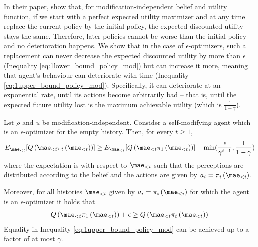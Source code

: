 In their paper, \citet{everitt} show that, for modification-independent belief and utility function, if we start with a perfect expected utility maximizer and at any time replace the current policy by the initial policy, the expected discounted utility stays the same. Therefore, later policies cannot be worse than the initial policy and no deterioration happens. We show that in the case of $\epsilon$-optimizers, such a replacement can never decrease the expected discounted utility by more than $\epsilon$ (Inequality \eqref{eq:1lower_bound_policy_mod}) but can increase it more, meaning that agent's behaviour can deteriorate with time (Inequality \eqref{eq:1upper_bound_policy_mod}). Specifically, it can deteriorate at an exponential rate, until its actions become arbitrarily bad -- that is, until the expected future utility lost is the maximum achievable utility (which is $\frac{1}{1-\gamma}$).
\begin{theorem} \label{thm:policy_modification}
Let $\rho$ and $u$ be modification-independent. Consider a self-modifying agent which is an $\epsilon$-optimizer for the empty history. Then, for every $t \geq 1$, \begin{align}
E_{\mae_{<t}} [Q\left(\mae_{<t} \pi_{t}\left(\mae_{<t}\right)\right)] \geq E_{\mae_{<t}}[Q\left(\mae_{<t} \pi_{1}\left(\mae_{<t}\right)\right)] - \min(\frac{\epsilon}{\gamma^{t-1}}, \frac{1}{1-\gamma}) \label{eq:1upper_bound_policy_mod} %
\end{align}
where the expectation is with respect to $\mae_{<t}$ such that the perceptions are distributed according to the belief and the actions are given by $a_{i}=\pi_{i}\left(\mae_{<i}\right)$.

Moreover, for all histories $\mae_{<t}$ given by $a_{i}=\pi_{i}\left(\mae_{<i}\right)$ for which the agent is an $\epsilon$-optimizer it holds that
\begin{gather}
Q\left(\mae_{<t} \pi_{1}\left(\mae_{<t}\right)\right) + \epsilon \geq Q\left(\mae_{<t} \pi_{t}\left(\mae_{<t}\right)\right) \label{eq:1lower_bound_policy_mod}\\
\end{gather}
Equality in Inequality \eqref{eq:1upper_bound_policy_mod} can be achieved up to a factor of at most $\gamma$.
\end{theorem}

